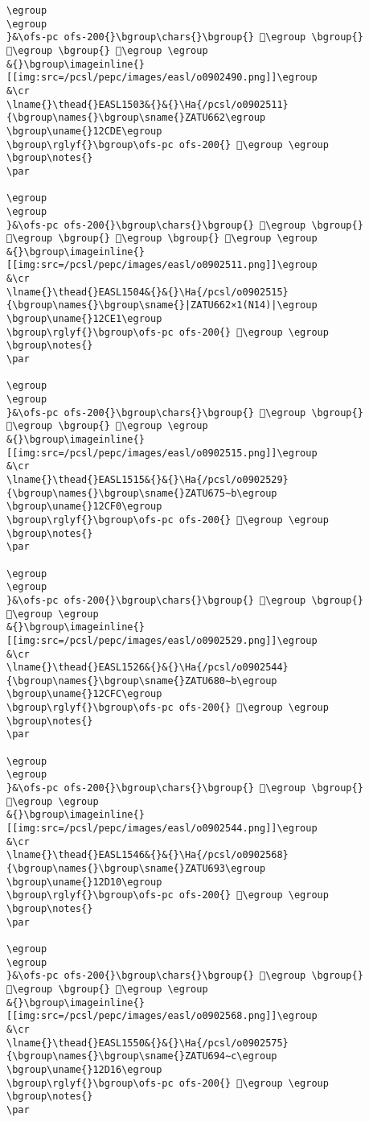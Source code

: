 \begin{verbatim}
\egroup
\egroup
}&\ofs-pc ofs-200{}\bgroup\chars{}\bgroup{} 𒳘\egroup \bgroup{} 𒳗\egroup \bgroup{} 𒳎\egroup \egroup
&{}\bgroup\imageinline{}[[img:src=/pcsl/pepc/images/easl/o0902490.png]]\egroup
&\cr
\lname{}\thead{}EASL1503&{}&{}\Ha{/pcsl/o0902511}{\bgroup\names{}\bgroup\sname{}ZATU662\egroup
\bgroup\uname{}12CDE\egroup
\bgroup\rglyf{}\bgroup\ofs-pc ofs-200{} 𒳞\egroup \egroup
\bgroup\notes{}
\par 

\egroup
\egroup
}&\ofs-pc ofs-200{}\bgroup\chars{}\bgroup{} 𒳤\egroup \bgroup{} 𒳠\egroup \bgroup{} 𒳞\egroup \bgroup{} 𒳢\egroup \egroup
&{}\bgroup\imageinline{}[[img:src=/pcsl/pepc/images/easl/o0902511.png]]\egroup
&\cr
\lname{}\thead{}EASL1504&{}&{}\Ha{/pcsl/o0902515}{\bgroup\names{}\bgroup\sname{}|ZATU662×1(N14)|\egroup
\bgroup\uname{}12CE1\egroup
\bgroup\rglyf{}\bgroup\ofs-pc ofs-200{} 𒳡\egroup \egroup
\bgroup\notes{}
\par 

\egroup
\egroup
}&\ofs-pc ofs-200{}\bgroup\chars{}\bgroup{} 𒳡\egroup \bgroup{} 𒳟\egroup \bgroup{} 𒳣\egroup \egroup
&{}\bgroup\imageinline{}[[img:src=/pcsl/pepc/images/easl/o0902515.png]]\egroup
&\cr
\lname{}\thead{}EASL1515&{}&{}\Ha{/pcsl/o0902529}{\bgroup\names{}\bgroup\sname{}ZATU675∼b\egroup
\bgroup\uname{}12CF0\egroup
\bgroup\rglyf{}\bgroup\ofs-pc ofs-200{} 𒳰\egroup \egroup
\bgroup\notes{}
\par 

\egroup
\egroup
}&\ofs-pc ofs-200{}\bgroup\chars{}\bgroup{} 𒳯\egroup \bgroup{} 𒳰\egroup \egroup
&{}\bgroup\imageinline{}[[img:src=/pcsl/pepc/images/easl/o0902529.png]]\egroup
&\cr
\lname{}\thead{}EASL1526&{}&{}\Ha{/pcsl/o0902544}{\bgroup\names{}\bgroup\sname{}ZATU680∼b\egroup
\bgroup\uname{}12CFC\egroup
\bgroup\rglyf{}\bgroup\ofs-pc ofs-200{} 𒳼\egroup \egroup
\bgroup\notes{}
\par 

\egroup
\egroup
}&\ofs-pc ofs-200{}\bgroup\chars{}\bgroup{} 𒳻\egroup \bgroup{} 𒳼\egroup \egroup
&{}\bgroup\imageinline{}[[img:src=/pcsl/pepc/images/easl/o0902544.png]]\egroup
&\cr
\lname{}\thead{}EASL1546&{}&{}\Ha{/pcsl/o0902568}{\bgroup\names{}\bgroup\sname{}ZATU693\egroup
\bgroup\uname{}12D10\egroup
\bgroup\rglyf{}\bgroup\ofs-pc ofs-200{} 𒴐\egroup \egroup
\bgroup\notes{}
\par 

\egroup
\egroup
}&\ofs-pc ofs-200{}\bgroup\chars{}\bgroup{} 𒴐\egroup \bgroup{} 𒴒\egroup \bgroup{} 𒴓\egroup \egroup
&{}\bgroup\imageinline{}[[img:src=/pcsl/pepc/images/easl/o0902568.png]]\egroup
&\cr
\lname{}\thead{}EASL1550&{}&{}\Ha{/pcsl/o0902575}{\bgroup\names{}\bgroup\sname{}ZATU694∼c\egroup
\bgroup\uname{}12D16\egroup
\bgroup\rglyf{}\bgroup\ofs-pc ofs-200{} 𒴖\egroup \egroup
\bgroup\notes{}
\par 


\end{verbatim}
